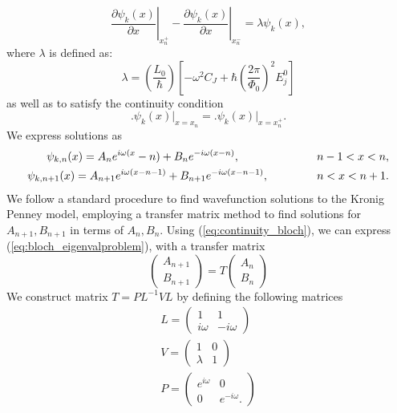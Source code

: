 %
\begin{equation}\label{eq:bloch_eigenvalproblem}
\left.\frac{\partial\psi_{k}(x)}{\partial x}\right|_{x_n^{+}}-\left.\frac{\partial\psi_{k}(x)}{\partial x}\right|_{x_n^{-}}=\lambda \psi_k(x),
\end{equation}
%
where $\lambda$ is defined as:
%
\begin{equation}
\lambda = \left(\frac{L_0}{\hbar}\right)  
\left[-\omega^2 C_{J}+\hbar\left(\frac{2 \pi}{\Phi_{0}}\right)^{2} E_{j}^0\right]
\end{equation}
%
as well as to satisfy the continuity condition
%
\begin{equation}\label{eq:continuity_bloch}
\biggl.\psi_{k}(x)\biggl|_{x=x_{n}}=\biggl.\psi_{k}(x)\biggr|_{x=x_{n}^{+}}.
\end{equation}
%
We express solutions as
%
\begin{align}
\psi_{k,n}(x) = A_n e^{i\omega(x}-n) + B_n e^{-i\omega(x-n)},\hspace{16ex} n-1 < x < n,\\
\psi_{k,n+1}(x) = A_{n+1} e^{i\omega(x-n-1)} + B_{n+1} e^{-i\omega(x-n-1)}, \hspace{10ex} n < x < n+1.
\end{align}
%
We follow a standard procedure to find wavefunction solutions to the Kronig Penney model, employing a transfer matrix method to find solutions for $A_{n+1}, B_{n+1}$ in terms of $A_n, B_n$. Using (\ref{eq:continuity_bloch}), we can express (\ref{eq:bloch_eigenvalproblem}), with a transfer matrix
%
\begin{equation}
 \begin{pmatrix}
 A_{n+1} \\ B_{n+1}
 \end{pmatrix}
 = T 
 \begin{pmatrix}
 A_n \\ B_n
 \end{pmatrix}
\end{equation}{}
%
We construct matrix $T=PL^{-1}VL$ by defining the following matrices 
%
\begin{align}
L = \begin{pmatrix}
1 & 1 \\
i\omega & -i\omega
\end{pmatrix} \\
%
V = \begin{pmatrix}
1 & 0 \\
\lambda & 1
\end{pmatrix} \\
%
P = \begin{pmatrix}
e^{i\omega} & 0 \\
0 & e^{-i\omega}.
\end{pmatrix}
\end{align} 
